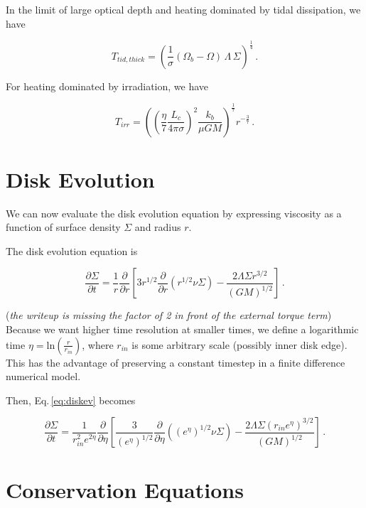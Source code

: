 \documentclass{article}
\begin{document}
In the limit of large optical depth and heating dominated by tidal dissipation, we have

\begin{equation}
T_{tid,thick} = \left(\frac{1}{\sigma}(\Omega_b - \Omega)\,\Lambda\,\Sigma\right)^\frac{1}{4}\,.
\end{equation}

For heating dominated by irradiation, we have

\begin{equation}
T_{irr} = \left(\left(\frac{\eta}{7}\frac{L_c}{4\pi\sigma}\right)^2 \frac{k_b}{\mu G M}\right)^\frac{1}{7} r^{-\frac{3}{7}}\,.
\end{equation}

\section{Disk Evolution}

We can now evaluate the disk evolution equation by expressing viscosity as a function of surface density $\Sigma$ and radius $r$.

The disk evolution equation is

\begin{equation} \label{eq:diskev}
\frac{\partial \Sigma}{\partial t} = \frac{1}{r} \frac{\partial}{\partial r} \left[3 r^{1/2} \frac{\partial}{\partial r} \left(r^{1/2} \nu \Sigma\right) - \frac{2 \Lambda \Sigma r^{3/2}}{(G M)^{1/2}}\right]\,.
\end{equation}

(\textit{the writeup is missing the factor of 2 in front of the external torque term})
Because we want higher time resolution at smaller times, we define a logarithmic time $\eta = \mathrm{ln}\left(\frac{r}{r_{in}}\right)$, where $r_{in}$ is some arbitrary scale (possibly inner disk edge). This has the advantage of preserving a constant timestep in a finite difference numerical model.

Then, Eq.\,\ref{eq:diskev} becomes 

\begin{equation}
\frac{\partial \Sigma}{\partial t} = \frac{1}{r_{in}^2 e^{2\eta}} \frac{\partial}{\partial \eta} \left[\frac{3}{(e^\eta)^{1/2}} \frac{\partial}{\partial \eta} \left((e^{\eta})^{1/2} \nu \Sigma\right) - \frac{2 \Lambda \Sigma (r_{in} e^{\eta})^{3/2}}{(G M)^{1/2}}\right]\,.
\end{equation}

\section{Conservation Equations}
\end{document}
